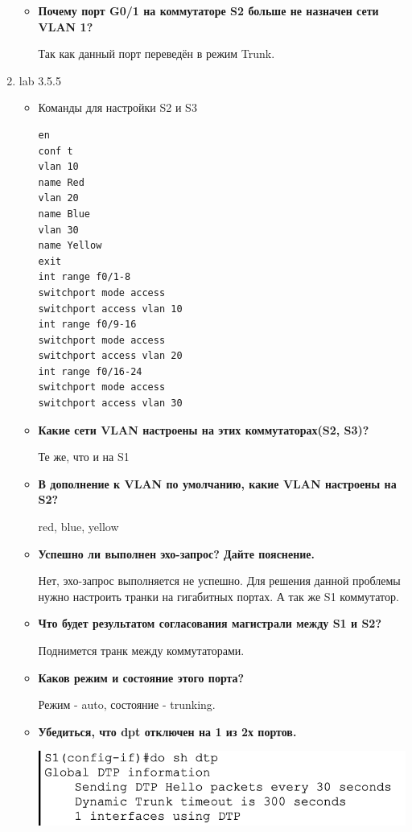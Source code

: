\documentclass[a4paper,14pt]{extarticle}
\begin{document}
\begin{enumerate}
\begin{itemize}
            \item \textbf{Почему порт G0/1 на коммутаторе S2 больше не назначен сети VLAN 1?}\par
                Так как данный порт переведён в режим Trunk.
                
        \end{itemize}
        \item lab 3.5.5
        \begin{itemize}
            \item Команды для настройки S2 и S3
                \begin{lstlisting}
en 
conf t
vlan 10 
name Red
vlan 20 
name Blue
vlan 30
name Yellow
exit
int range f0/1-8
switchport mode access
switchport access vlan 10
int range f0/9-16
switchport mode access
switchport access vlan 20
int range f0/16-24
switchport mode access
switchport access vlan 30
                \end{lstlisting}
            \item \textbf{Какие сети VLAN настроены на этих коммутаторах(S2, S3)?}\par
                Те же, что и на S1
            \item \textbf{В дополнение к VLAN по умолчанию, какие VLAN настроены на S2?}\par
                red, blue, yellow
            \item \textbf{Успешно ли выполнен эхо-запрос? Дайте пояснение.}\par
                Нет, эхо-запрос выполняется не успешно. Для решения данной проблемы нужно настроить транки на гигабитных портах. А так же S1 коммутатор.
            \item \textbf{Что будет результатом согласования магистрали между S1 и S2?}\par
                Поднимется транк между коммутаторами.
            \item \textbf{Каков режим и состояние этого порта?}\par
                Режим - auto, состояние - trunking.
            \item \textbf{Убедиться, что dpt отключен на 1 из 2х портов.}\par
                \begin{center}
                    \includegraphics[scale=0.8]{pics/3.5.5_1.png}

\end{center}
\end{itemize}
\end{enumerate}
\end{document}
